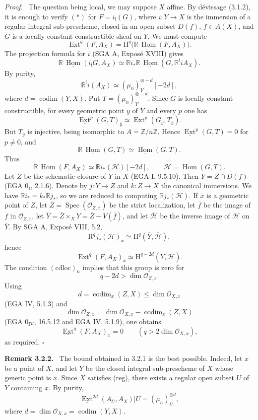 \documentclass[11pt]{article}
\DeclareMathOperator{\codim}{codim}
\providecommand{\cO}{\mathcal{O}}
\providecommand{\Hh}{\mathrm{H}}
\providecommand{\uExt}{\underline{\Ext}}
\providecommand{\qedtext}{\hfill$\square$}
\providecommand{\ZZ}{\mathbb{Z}}
\newenvironment{statement}[1]{\par\medskip\noindent\textbf{#1.}\ }{\par\medskip}
\newenvironment{prooftext}[1][Proof]{\par\noindent\emph{#1.}\ }{\par\medskip}
\DeclareMathOperator{\Hom}{Hom}
\DeclareMathOperator{\Ext}{Ext}
\DeclareMathOperator{\Spec}{Spec}
\newcommand{\R}{\mathrm{R}}
\newcommand{\ol}[1]{\overline{#1}}
\providecommand{\Hom}{\operatorname{Hom}}
\providecommand{\R}{\mathrm R}
\providecommand{\Spec}{\operatorname{Spec}}
\providecommand{\Spec}{\operatorname{Spec}}
\providecommand{\Hom}{\operatorname{Hom}}
\providecommand{\Spec}{\operatorname{Spec}}
\providecommand{\qedtext}{\hfill$\square$}
\providecommand{\Spec}{\operatorname{Spec}}
\begin{document}
\begin{prooftext}
The question being local, we may suppose $X$ affine. By dévissage (3.1.2), it is enough to verify $(*)$ for $F=i_!(G)$, where $i:Y\to X$ is the immersion of a regular integral sub-prescheme, closed in an open subset $D(f)$, $f\in A(X)$, and $G$ is a locally constant constructible sheaf on $Y$. We must compute
\[
   \uExt^q(F,A_X)=\Hh^q\bigl(\mathbb{R}\,\underline{\Hom}(F,A_X)\bigr).
\]
The projection formula for $i$ (SGA A, Exposé XVIII) gives
\[
 \mathbb{R}\,\underline{\Hom}(i_!G,A_X)
   \simeq
 \mathbb{R} i_*\mathbb{R}\,\underline{\Hom}(G,\mathbb{R}^!iA_X).
\]
By purity,
\[
   \mathbb{R}^!i(A_X)\simeq(\mu_n)^{\otimes -d}_Y[-2d],
\]
where $d=\codim(Y,X)$. Put $T=(\mu_n)^{\otimes -d}_Y$. Since $G$ is locally constant constructible, for every geometric point $\ol y$ of $Y$ and every $p$ one has
\[
   \uExt^p(G,T)_{\ol y}\simeq\Ext^p(G_{\ol y},T_{\ol y}).
\]
But $T_{\ol y}$ is injective, being isomorphic to $A=\ZZ/n\ZZ$. Hence $\uExt^p(G,T)=0$ for $p\ne0$, and
\[
   \mathbb{R}\,\underline{\Hom}(G,T)\simeq\underline{\Hom}(G,T).
\]
Thus
\[
   \mathbb{R}\,\underline{\Hom}(F,A_X)
      \simeq \mathbb{R} i_*(\mathcal H)[-2d],
   \qquad \mathcal H=\underline{\Hom}(G,T).
\]
Let $Z$ be the schematic closure of $Y$ in $X$ (EGA I, 9.5.10). Then $Y=Z\cap D(f)$ (EGA $0_{\mathrm I}$, 2.1.6). Denote by $j:Y\to Z$ and $k:Z\to X$ the canonical immersions. We have $\mathbb{R} i_*=k_*\mathbb{R} j_*$, so we are reduced to computing $\mathbb{R} j_*(\mathcal H)$. If $\ol x$ is a geometric point of $Z$, let $\ol Z=\Spec(\cO_{Z,\ol x})$ be the strict localization, let $\ol f$ be the image of $f$ in $\cO_{Z,\ol x}$, let $\ol Y=\ol Z\times_XY=\ol Z-V(\ol f)$, and let $\ol{\mathcal H}$ be the inverse image of $\mathcal H$ on $\ol Y$. By SGA A, Exposé VIII, 5.2,
\[
   \R^qj_*(\mathcal H)_{\ol x}
      \simeq\Hh^q(\ol Y,\ol{\mathcal H}),
\]
hence
\[
   \uExt^q(F,A_X)_{\ol x}
      \simeq\Hh^{q-2d}(\ol Y,\ol{\mathcal H}).
\]
The condition $(\mathrm{cdloc})_n$ implies that this group is zero for
\[
   q-2d>\dim\cO_{Z,x}.
\]
Using
\[
   d=\codim_x(Z,X)\le\dim\cO_{X,x}
\]
(EGA IV, 5.1.3) and
\[
   \dim\cO_{Z,x}
     =\dim\cO_{X,x}-\codim_x(Z,X)
\]
(EGA $0_{\mathrm{IV}}$, 16.5.12 and EGA IV, 5.1.9), one obtains
\[
   \uExt^q(F,A_X)_x=0\qquad(q>2\dim\cO_{X,x}),
\]
as required. \qedtext
\end{prooftext}

\begin{statement}{Remark 3.2.2}
The bound obtained in 3.2.1 is the best possible. Indeed, let $x$ be a point of $X$, and let $Y$ be the closed integral sub-prescheme of $X$ whose generic point is $x$. Since $X$ satisfies (reg), there exists a regular open subset $U$ of $Y$ containing $x$. By purity,
\[
   \uExt^{2d}(A_U,A_X)|U=(\mu_n)^{\otimes d}_U,
\]
where $d=\dim\cO_{X,x}=\codim(Y,X)$.
\end{statement}
\end{document}
